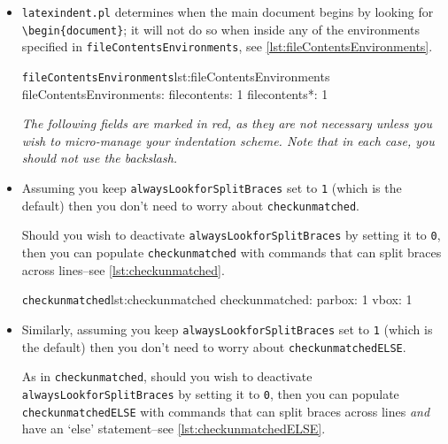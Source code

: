 \documentclass[11pt]{article}
\newcommand{\verbitem}[1]{\small\PVerb{#1}}
\begin{document}
\begin{itemize}
\item[\verbitem{fileContentsEnvironments}] 
  \lstinline!latexindent.pl! determines when the main document begins by looking for \lstinline!\begin{document}!; 
  it will not do so when inside any of the environments specified in \lstinline!fileContentsEnvironments!, see
  \cref{lst:fileContentsEnvironments}.
\begin{cmhlistings}[style=yaml]{\lstinline!fileContentsEnvironments!}{lst:fileContentsEnvironments}
fileContentsEnvironments:
    filecontents: 1
    filecontents*: 1
  \end{cmhlistings}

	\begin{warning}
		\emph{The following fields are marked in red, as they are not necessary
			unless you wish to micro-manage your indentation scheme.
			Note that in each case, you should \emph{not} use the backslash.}
	\end{warning}

	\item[\color{red}\verbitem{checkunmatched}] Assuming you keep \lstinline!alwaysLookforSplitBraces! set to \lstinline!1! (which
	      is the default) then you don't need to worry about \lstinline!checkunmatched!.

	      Should you wish to deactivate \lstinline!alwaysLookforSplitBraces! by setting it to \lstinline!0!, then
	      you can populate \lstinline!checkunmatched! with commands that can split braces across
	      lines--see \cref{lst:checkunmatched}.

	      \begin{cmhlistings}[style=yaml]{\lstinline!checkunmatched!}{lst:checkunmatched}
checkunmatched:
    parbox: 1
    vbox: 1
	\end{cmhlistings}
	\item[\color{red}\verbitem{checkunmatchedELSE}] Similarly, assuming you keep \lstinline!alwaysLookforSplitBraces! set to \lstinline!1! (which
	      is the default) then you don't need to worry about \lstinline!checkunmatchedELSE!.

	      As in \lstinline!checkunmatched!, should you wish to deactivate \lstinline!alwaysLookforSplitBraces! by setting it to \lstinline!0!, then
	      you can populate \lstinline!checkunmatchedELSE! with commands that can split braces across
	      lines \emph{and} have an `else' statement--see \cref{lst:checkunmatchedELSE}.


\end{itemize}
\end{document}
